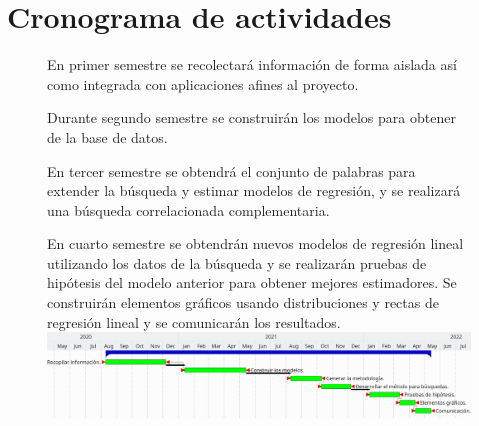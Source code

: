 \section {Cronograma de actividades}
\begin{figure}[H]
En primer semestre se recolectará información de forma aislada así como integrada con aplicaciones afines al proyecto.

Durante segundo semestre se construirán los modelos para obtener de la base de datos.

En tercer semestre se obtendrá el conjunto de palabras para extender la búsqueda y estimar modelos de regresión, y se realizará una búsqueda correlacionada complementaria.

En cuarto semestre se obtendrán nuevos modelos de regresión lineal utilizando los datos de la búsqueda y se realizarán pruebas de hipótesis del modelo anterior para obtener mejores estimadores. Se construirán elementos gráficos usando distribuciones y rectas de regresión lineal y se comunicarán los resultados.\\
\includegraphics[width=1\linewidth]{gantt.png}\end{figure}